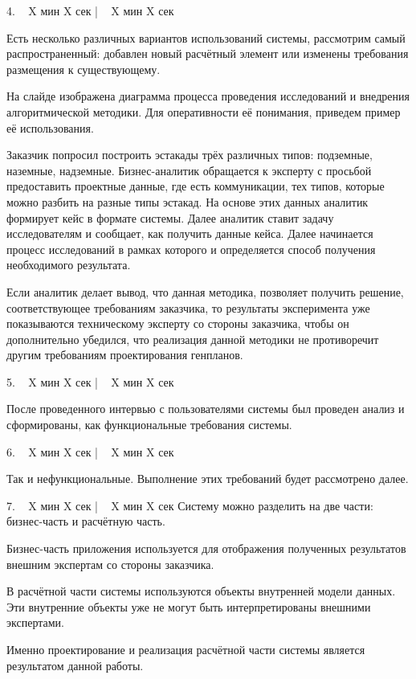 \documentclass[a4paper,14pt]{extarticle}
\begin{document}
    4. ~ X мин X сек | ~ X мин X сек

    Есть несколько различных вариантов использований системы, рассмотрим самый распространенный:
    добавлен новый расчётный элемент или изменены требования размещения к существующему.

    На слайде изображена диаграмма процесса проведения исследований и внедрения алгоритмической методики.
    Для оперативности её понимания, приведем пример её использования.

    Заказчик попросил построить эстакады трёх различных типов: подземные, наземные, надземные.
    Бизнес-аналитик обращается к эксперту с просьбой предоставить проектные данные, где есть коммуникации,
    тех типов, которые можно разбить на разные типы эстакад.
    На основе этих данных аналитик формирует кейс в формате системы.
    Далее аналитик ставит задачу исследователям и сообщает, как получить данные кейса.
    Далее начинается процесс исследований в рамках которого и определяется способ получения необходимого результата.

    Если аналитик делает вывод, что данная методика, позволяет получить решение, соответствующее требованиям
    заказчика, то результаты эксперимента уже показываются техническому эксперту со стороны заказчика,
    чтобы он дополнительно убедился, что реализация данной методики не противоречит другим требованиям
    проектирования генпланов.

    5. ~ X мин X сек | ~ X мин X сек

    После проведенного интервью с пользователями системы был проведен анализ и сформированы,
    как функциональные требования системы.

    6. ~ X мин X сек | ~ X мин X сек

    Так и нефункциональные.
    Выполнение этих требований будет рассмотрено далее.

    7. ~ X мин X сек | ~ X мин X сек
    Систему можно разделить на две части: бизнес-часть и расчётную часть.

    Бизнес-часть приложения используется для отображения полученных результатов внешним экспертам со стороны заказчика.

    В расчётной части системы используются объекты внутренней модели данных.
    Эти внутренние объекты уже не могут быть интерпретированы внешними экспертами.

    Именно проектирование и реализация расчётной части системы является результатом данной работы.
\end{document}
